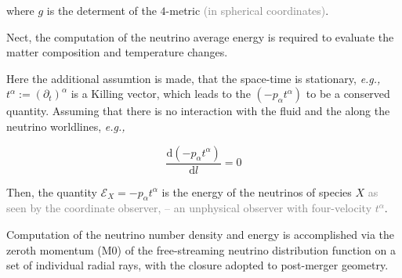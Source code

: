 \documentclass[11pt,a4paper,headinclude=true,DIV=14,BCOR=8mm,chapterprefix,listof=totoc,twoside,openright,abstracton]{scrbook}
\newcommand{\gray}[1]{\textcolor{gray}{#1}}
\newcommand{\dd}{\text{d}}
\begin{document}
where $g$ is the determent of the $4$-metric \gray{(in spherical coordinates)}.




Nect, the computation of the neutrino average energy is required to evaluate the matter composition and temperature changes.

Here the additional assumtion is made, that the space-time is stationary, \textit{e.g.,} $t^{\alpha}:=(\partial_t)^{\alpha}$ is a Killing vector, which leads to the $(-p_{\alpha}t^{\alpha})$ to be a conserved quantity.
Assuming that there is no interaction with the fluid and the along the neutrino worldlines, \textit{e.g.,}

\begin{equation}
\frac{\dd(-p_{\alpha}t^{\alpha})}{\dd l} = 0
\end{equation}

Then, the quantity $\mathcal{E}_X = -p_{\alpha}t^{\alpha}$ is the energy of the neutrinos of species $X$ \gray{as seen by the coordinate observer, -- an unphysical observer with four-velocity $t^{\alpha}$}.

%
%
%
%
%
%
%


Computation of the 
neutrino number density and energy is 
accomplished via the zeroth momentum (M0) of the free-streaming neutrino distribution function on a set of individual radial rays, with the closure adopted to post-merger geometry.
\end{document}
